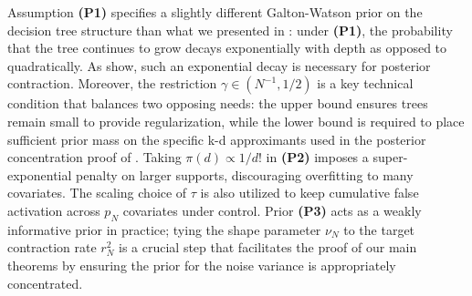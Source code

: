 \documentclass[11pt]{article}
\theoremstyle{plain}
\theoremstyle{definition}
\theoremstyle{plain}
\begin{document}
Assumption \textbf{(P1)} specifies a slightly different Galton-Watson prior on the decision tree structure than what we presented in : under \textbf{(P1)}, the probability that the tree continues to grow decays exponentially with depth as opposed to quadratically. 
As \citet{rockovasaha} show, such an exponential decay is necessary for posterior contraction.
Moreover, the restriction $\gamma \in (N^{-1},1/2)$ is a key technical condition that balances two opposing needs: the upper bound ensures trees remain small to provide regularization, while the lower bound is required to place sufficient prior mass on the specific k-d approximants used in the posterior concentration proof of .
Taking $\pi(d) \propto 1/d!$ in \textbf{(P2)} imposes a super-exponential penalty on larger supports, discouraging overfitting to many covariates. 
The scaling choice of $\tau$ is also utilized to keep cumulative false activation across $p_N$ covariates under control. 
Prior \textbf{(P3)} acts as a weakly informative prior in practice; tying the shape parameter $\nu_N$ to the target contraction rate $r_N ^2$ is a crucial step that facilitates the proof of our main theorems by ensuring the prior for the noise variance is appropriately concentrated. 
\end{document}
